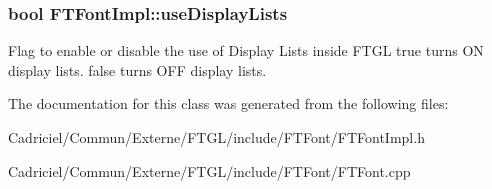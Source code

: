 \subsubsection[{\texorpdfstring{use\+Display\+Lists}{useDisplayLists}}]{\setlength{\rightskip}{0pt plus 5cm}bool F\+T\+Font\+Impl\+::use\+Display\+Lists\hspace{0.3cm}{\ttfamily [protected]}}\hypertarget{class_f_t_font_impl_a5c21ea909477c7180b86625fef6af457}{}\label{class_f_t_font_impl_a5c21ea909477c7180b86625fef6af457}
Flag to enable or disable the use of Display Lists inside F\+T\+GL {\ttfamily true} turns ON display lists. {\ttfamily false} turns O\+FF display lists. 

The documentation for this class was generated from the following files\+:\begin{DoxyCompactItemize}
\item 
Cadriciel/\+Commun/\+Externe/\+F\+T\+G\+L/include/\+F\+T\+Font/F\+T\+Font\+Impl.\+h\item 
Cadriciel/\+Commun/\+Externe/\+F\+T\+G\+L/include/\+F\+T\+Font/F\+T\+Font.\+cpp\end{DoxyCompactItemize}
